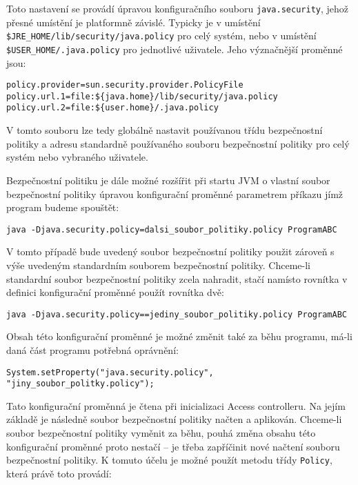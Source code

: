 Toto nastavení se provádí úpravou konfiguračního souboru {\tt java.security}, jehož přesné umístění je platformně závislé. Typicky je v umístění {\tt \$JRE\_HOME/lib/security/java.policy} pro celý systém, nebo v umístění {\tt \$USER\_HOME/.java.policy} pro jednotlivé uživatele. \cite{refSecurity}
Jeho význačnější proměnné jsou: \cite[5.3.1]{oaks}

\begin{verbatim}
policy.provider=sun.security.provider.PolicyFile
policy.url.1=file:${java.home}/lib/security/java.policy
policy.url.2=file:${user.home}/.java.policy
\end{verbatim}

V tomto souboru lze tedy globálně nastavit používanou třídu bezpečnostní politiky a adresu standardně používaného souboru bezpečnostní politiky pro celý systém nebo vybraného uživatele.

Bezpečnostní politiku je dále možné rozšířit při startu JVM o vlastní soubor bezpečnostní politiky úpravou konfigurační proměnné parametrem příkazu jímž program budeme spouštět: \cite[5.3.1]{oaks}

\begin{verbatim}
java -Djava.security.policy=dalsi_soubor_politiky.policy ProgramABC
\end{verbatim}

V tomto případě bude uvedený soubor bezpečnostní politiky použit zároveň s výše uvedeným standardním souborem bezpečnostní politiky. Chceme-li standardní soubor bezpečnostní politiky zcela nahradit, stačí namísto rovnítka v definici konfigurační proměnné použít rovnítka dvě: \cite[5.3.1]{oaks}

\begin{verbatim}
java -Djava.security.policy==jediny_soubor_politiky.policy ProgramABC
\end{verbatim}

Obsah této konfigurační proměnné je možné změnit také za běhu programu, má-li daná část programu potřebná oprávnění:

\begin{verbatim}
System.setProperty("java.security.policy", "jiny_soubor_politky.policy");
\end{verbatim}

Tato konfigurační proměnná je čtena při inicializaci Access controlleru. Na jejím základě je následně soubor bezpečnostní politiky načten a aplikován. Chceme-li soubor bezpečnostní politiky vyměnit za běhu, pouhá změna obsahu této konfigurační proměnné proto nestačí -- je třeba zapříčinit nové načtení souboru bezpečnostní politiky. K tomuto účelu je možné použít metodu třídy {\tt Policy}, která právě toto provádí:

